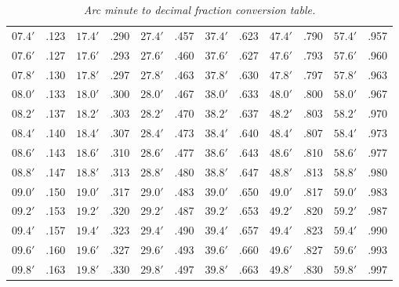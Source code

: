 \begin{table}
{\begin{tabular}{ll|ll|ll|ll|ll|ll}
$07.4'$ & .123 & $17.4'$ & .290 & $27.4'$ & .457 & $37.4'$ & .623 & $47.4'$ & .790 & $57.4'$ & .957\\
$07.6'$ & .127 & $17.6'$ & .293 & $27.6'$ & .460 & $37.6'$ & .627 & $47.6'$ & .793 & $57.6'$ & .960\\
$07.8'$ & .130 & $17.8'$ & .297 & $27.8'$ & .463 & $37.8'$ & .630 & $47.8'$ & .797 & $57.8'$ & .963\\
$08.0'$ & .133 & $18.0'$ & .300 & $28.0'$ & .467 & $38.0'$ & .633 & $48.0'$ & .800 & $58.0'$ & .967\\
$08.2'$ & .137 & $18.2'$ & .303 & $28.2'$ & .470 & $38.2'$ & .637 & $48.2'$ & .803 & $58.2'$ & .970\\
$08.4'$ & .140 & $18.4'$ & .307 & $28.4'$ & .473 & $38.4'$ & .640 & $48.4'$ & .807 & $58.4'$ & .973\\
$08.6'$ & .143 & $18.6'$ & .310 & $28.6'$ & .477 & $38.6'$ & .643 & $48.6'$ & .810 & $58.6'$ & .977\\
$08.8'$ & .147 & $18.8'$ & .313 & $28.8'$ & .480 & $38.8'$ & .647 & $48.8'$ & .813 & $58.8'$ & .980\\
$09.0'$ & .150 & $19.0'$ & .317 & $29.0'$ & .483 & $39.0'$ & .650 & $49.0'$ & .817 & $59.0'$ & .983\\
$09.2'$ & .153 & $19.2'$ & .320 & $29.2'$ & .487 & $39.2'$ & .653 & $49.2'$ & .820 & $59.2'$ & .987\\
$09.4'$ & .157 & $19.4'$ & .323 & $29.4'$ & .490 & $39.4'$ & .657 & $49.4'$ & .823 & $59.4'$ & .990\\
$09.6'$ & .160 & $19.6'$ & .327 & $29.6'$ & .493 & $39.6'$ & .660 & $49.6'$ & .827 & $59.6'$ & .993\\
$09.8'$ & .163 & $19.8'$ & .330 & $29.8'$ & .497 & $39.8'$ & .663 & $49.8'$ & .830 & $59.8'$ & .997\\
\end{tabular}}
\caption{\em Arc minute to decimal fraction conversion table.}\label{lt6a}
\end{table}

